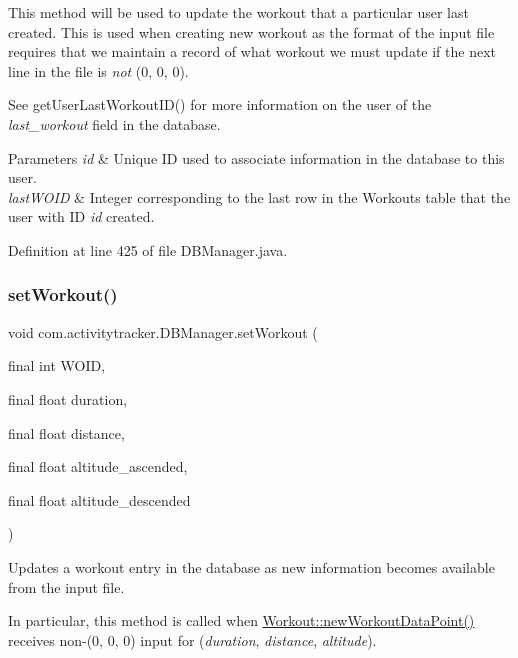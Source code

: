 This method will be used to update the workout that a particular user last created. This is used when creating new workout as the format of the input file requires that we maintain a record of what workout we must update if the next line in the file is {\itshape not} (0, 0, 0).

See get\+User\+Last\+Workout\+I\+D() for more information on the user of the {\itshape last\+\_\+workout} field in the database.


\begin{DoxyParams}{Parameters}
{\em id} & Unique ID used to associate information in the database to this user. \\
\hline
{\em last\+W\+O\+ID} & Integer corresponding to the last row in the Workouts table that the user with ID {\itshape id} created. \\
\hline
\end{DoxyParams}


Definition at line 425 of file D\+B\+Manager.\+java.

\mbox{\label{classcom_1_1activitytracker_1_1_d_b_manager_a61b9a3229c76f9d07cc5b092d90b7ff5}} 
\subsubsection{\texorpdfstring{set\+Workout()}{setWorkout()}}
{\footnotesize\ttfamily void com.\+activitytracker.\+D\+B\+Manager.\+set\+Workout (\begin{DoxyParamCaption}\item[{final int}]{W\+O\+ID,  }\item[{final float}]{duration,  }\item[{final float}]{distance,  }\item[{final float}]{altitude\+\_\+ascended,  }\item[{final float}]{altitude\+\_\+descended }\end{DoxyParamCaption})}

Updates a workout entry in the database as new information becomes available from the input file.

In particular, this method is called when \mbox{\hyperlink{classcom_1_1activitytracker_1_1_workout_aa595f618a20c8e98bb96c221c5158e9a}{Workout\+::new\+Workout\+Data\+Point()}} receives non-\/(0, 0, 0) input for ({\itshape duration}, {\itshape distance}, {\itshape altitude}).


